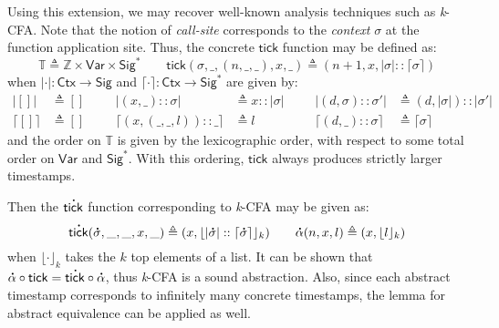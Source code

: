 \documentclass[acmsmall,screen,review]{acmart}\settopmatter{printfolios=true,printccs=false,printacmref=false}
\theoremstyle{acmdefinition}
\newcommand*{\cons}{::}
\newcommand*{\A}[1]{\overset{\,_{\mbox{\Large .}}}{#1}}
\newcommand*{\ExprVar}{\mathsf{Var}}
\newcommand*{\modid}{d}
\newcommand*{\Time}{\mathbb{T}}
\newcommand*{\ctx}{\sigma}
\newcommand*{\Ctx}{\mathsf{Ctx}}
\newcommand*{\Sig}{\mathsf{Sig}}
\newcommand*{\tick}{\mathsf{tick}}
\begin{document}
Using this extension, we may recover well-known analysis techniques such as \emph{k}-CFA.
Note that the notion of \emph{call-site} corresponds to the \emph{context} $\ctx$ at the function application site.
Thus, the concrete $\tick$ function may be defined as:
\[\Time\triangleq\mathbb{Z}\times\ExprVar\times\Sig^*\qquad\tick(\ctx,\_,(n,\_,\_),x,\_)\triangleq(n+1,x,|\ctx|\cons\lceil\ctx\rceil)\]
when $|\cdot|:\Ctx\rightarrow\Sig$ and $\lceil\cdot\rceil:\Ctx\rightarrow\Sig^*$ are given by:
\begin{align*}
  |[]|           & \triangleq [] &  &  & |(x,\_)\cons\ctx|                & \triangleq x\cons|\ctx| &  &  & |(\modid,\ctx)\cons\ctx'|        & \triangleq(\modid,|\ctx|)\cons|\ctx'| \\
  \lceil[]\rceil & \triangleq [] &  &  & \lceil(x,(\_,\_,l))\cons\_\rceil & \triangleq l            &  &  & \lceil(\modid,\_)\cons\ctx\rceil & \triangleq\lceil\ctx\rceil
\end{align*}
and the order on $\Time$ is given by the lexicographic order, with respect to some total order on $\ExprVar$ and $\Sig^*$.
With this ordering, $\tick$ always produces strictly larger timestamps.

Then the $\A\tick$ function corresponding to \emph{k}-CFA may be given as:
\[\A\tick(\A\ctx,\_,\_,x,\_)\triangleq(x,\lfloor|\A\ctx|\cons\lceil\A\ctx\rceil\rfloor_k)\qquad\A\alpha(n,x,l)\triangleq(x,\lfloor l\rfloor_k)\]
when $\lfloor\cdot\rfloor_k$ takes the $k$ top elements of a list.
It can be shown that $\A\alpha\circ\tick=\A\tick\circ\A\alpha$, thus \emph{k}-CFA is a sound abstraction.
Also, since each abstract timestamp corresponds to infinitely many concrete timestamps, the lemma for abstract equivalence can be applied as well.
\end{document}

